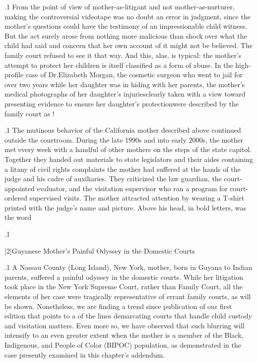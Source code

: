 \documentclass[11pt, twoside]{article}
\begin{document}
{\p.1{%
From the point of view of mother-as-litigant and not
mother-as-nurturer, making
the controversial videotape was no doubt an error in
judgment, since the mother’s questions could have  the testimony of an impressionable child witness. But the act surely arose from
nothing more malicious than shock over what the child had said and
concern that her own account of it might not be believed. The family
court refused to see it that way. And this, alas, is typical: the mother’s
attempt to protect her children is itself classified as a form of abuse.
In the high-profile case of Dr.\@ Elizabeth Morgan, the cosmetic surgeon
who went to jail for over two years while her daughter was in hiding
with her parents, the mother’s medical photographs of her daughter’s
injuries\mdash{}clearly taken with a view toward presenting evidence to ensure her daughter’s protection\mdash{}were described by the family court as
!
}%

\p.1{%
The mutinous behavior of the California mother described above
continued outside the courtroom. During the late 1990s and into early
2000s, the mother met every week with a handful of other mothers on
the steps of the state capitol. Together they handed out materials to
state legislators and their aides containing a litany of civil rights complaints the mother had suffered at the hands of the judge and his cadre of
auxiliaries. They criticized the law guardian, the court-appointed evaluator, and the visitation supervisor who ran a program for court-ordered
supervised visits. The mother attracted attention by wearing a T-shirt
printed with the judge’s name and picture. Above his head, in bold
letters, was the word 
}%

\p.1{%
}%


\s|2|{Guyanese Mother’s Painful Odyssey in the Domestic Courts}

\p.1{%
\noindent{}A Nassau County (Long Island), New York, mother, born in Guyana to
Indian parents, suffered a painful odyssey in the domestic courts. While
her litigation took place in the New York Supreme Court, rather than
Family Court, all the elements of her case were tragically representative
of errant family courts, as will be shown. Nonetheless, we are finding
a trend since publication of our first edition that points to a 
of the lines demarcating courts that handle child custody and visitation
matters. Even more so, we have observed that such blurring will intensify to an even greater extent when the mother is a member of the Black,
Indigenous, and People of Color (BIPOC) population, as demonstrated
in the case presently examined in this chapter’s addendum.
}%

}
\end{document}

